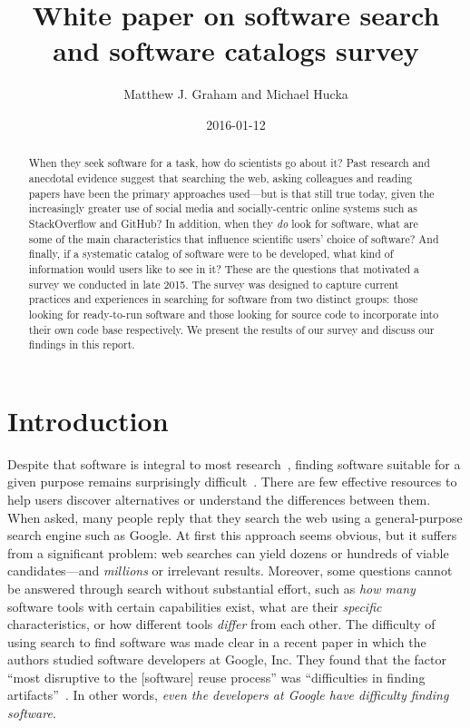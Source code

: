 \documentclass{casicswhitepaper}
\begin{document}
\title{White paper on software search and software catalogs survey}
\date{2016-01-12}
\author{Matthew J. Graham and Michael Hucka}
\maketitle

\begin{abstract}
When they seek software for a task, how do scientists go about it?  Past research and anecdotal evidence suggest that searching the web, asking colleagues and reading papers have been the primary approaches used---but is that still true today, given the increasingly greater use of social media and socially-centric online systems such as StackOverflow and GitHub?  In addition, when they \emph{do} look for software, what are some of the main characteristics that influence scientific users' choice of software?  And finally, if a systematic catalog of software were to be developed, what kind of information would users like to see in it?  These are the questions that motivated a survey we conducted in late 2015.  The survey was designed to capture current practices and experiences in searching for software from two distinct groups: those looking for ready-to-run software and those looking for source code to incorporate into their own code base respectively.  We present the results of our survey and discuss our findings in this report.
\end{abstract}


\section{Introduction}

Despite that software is integral to most research~\citep{bauer2014exploratory, hettrick_2014, hannay_2009, baxter_2006, wilson_2006}, finding software suitable for a given purpose remains surprisingly difficult~\cite{cannata_2005, Bourne::2015, SoftwareDiscoveryIndex:2014}.  There are few effective resources to help users discover alternatives or understand the differences between them.  When asked, many people reply that they search the web using a general-purpose search engine such as Google.  At first this approach seems obvious, but it suffers from a significant problem: web searches can yield dozens or hundreds of viable candidates---and \emph{millions} or irrelevant results.  Moreover, some questions cannot be answered through search without substantial effort, such as \emph{how many} software tools with certain capabilities exist, what are their \emph{specific} characteristics, or how different tools \emph{differ} from each other.  The difficulty of using search to find software was made clear in a recent paper in which the authors studied software developers at Google, Inc.  They found that the factor ``most disruptive to the [software] reuse process'' was ``difficulties in finding artifacts''~\cite{bauer2014exploratory}.  In other words, \emph{even the developers at Google have difficulty finding software}.
\end{document}
